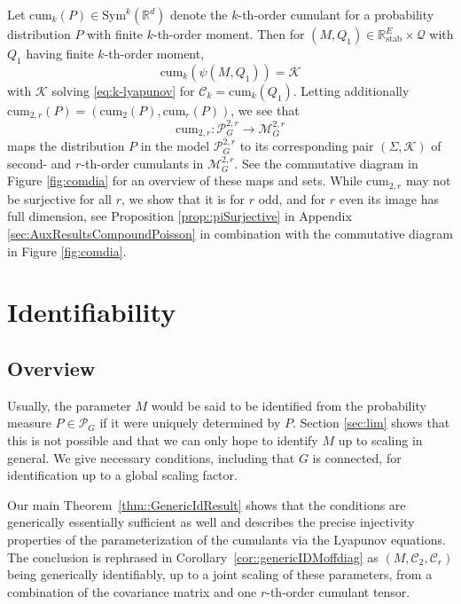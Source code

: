 \documentclass{biometrika}
\begin{document}
Let $\mathrm{cum}_k(P) \in \mathrm{Sym}^k(\mathbb{R}^d)$ denote the $k$-th-order cumulant for a 
probability distribution $P$ with finite $k$-th-order moment. Then for 
$(M, Q_1) \in \mathbb{R}^E_{\mathrm{stab}} \times \mathcal{Q}$ with $Q_1$ having finite $k$-th-order 
moment, 
$$
    \mathrm{cum}_k(\psi(M, Q_1)) = \mathcal{K} 
$$
with $\mathcal{K}$ solving \eqref{eq:k-lyapunov} for $\mathcal{C}_k = \mathrm{cum}_k(Q_1).$ 
Letting additionally $\mathrm{cum}_{2,r}(P) = (\mathrm{cum}_2(P), \mathrm{cum}_r(P))$, we see that 
$$
    \mathrm{cum}_{2,r} : \mathcal{P}^{2, r}_G \to \mathcal{M}^{2, r}_G 
$$
maps the distribution $P$ in the model $\mathcal{P}^{2, r}_G$ to its corresponding 
pair $(\Sigma, \mathcal{K} )$ of second- and $r$-th-order cumulants in $\mathcal{M}^{2, r}_G$. See the commutative diagram in Figure \ref{fig:comdia} for an overview of these maps and sets. 
While $\mathrm{cum}_{2,r}$ may not be surjective for all $r$, we show that 
it is for $r$ odd, and for $r$ even its image has full dimension, see Proposition \ref{prop::piSurjective} in Appendix \ref{sec:AuxResultsCompoundPoisson} in combination with the commutative diagram in Figure \ref{fig:comdia}. 





\section{Identifiability}

\subsection{Overview}

Usually, the parameter $M$ would be said to be identified from the probability 
measure $P \in \mathcal{P}_G$ if it were uniquely determined by $P$. Section \ref{sec:lim} shows
that this is not possible and that we can only hope to identify 
$M$ up to scaling in general. We give necessary conditions, including that $G$ is connected, 
for identification up to a global scaling factor.

Our main Theorem~\ref{thm::GenericIdResult} shows that the conditions 
are generically essentially sufficient as well and describes the precise
injectivity properties of the parameterization of the cumulants via the Lyapunov equations. 
The conclusion is rephrased in Corollary~\ref{cor::genericIDMoffdiag} as
$(M, \mathcal{C}_2, \mathcal{C}_r)$ being generically identifiably, up to a joint 
scaling of these parameters, from a combination of the covariance matrix 
and one $r$-th-order cumulant tensor.
\end{document}
